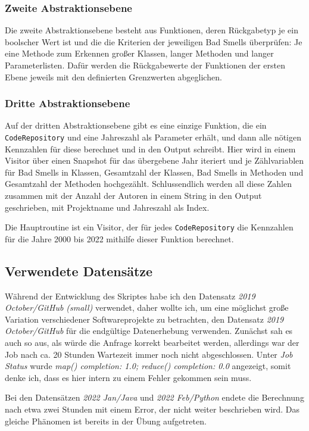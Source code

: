 \documentclass[12pt]{article}
\begin{document}
\subsubsection{Zweite Abstraktionsebene}
Die zweite Abstraktionsebene besteht aus Funktionen, deren Rückgabetyp je ein boolscher Wert ist und die die Kriterien der jeweiligen Bad Smells überprüfen: Je eine Methode zum Erkennen großer Klassen, langer Methoden und langer Parameterlisten.
Dafür werden die Rückgabewerte der Funktionen der ersten Ebene jeweils mit den definierten Grenzwerten abgeglichen.

\subsubsection{Dritte Abstraktionsebene}
Auf der dritten Abstraktionsebene gibt es eine einzige Funktion, die ein \texttt{CodeRepository} und eine Jahreszahl als Parameter erhält, und dann alle nötigen Kennzahlen für diese berechnet und in den Output schreibt.
Hier wird in einem Visitor über einen Snapshot für das übergebene Jahr iteriert und je Zählvariablen für Bad Smells in Klassen, Gesamtzahl der Klassen, Bad Smells in Methoden und Gesamtzahl der Methoden hochgezählt.
Schlussendlich werden all diese Zahlen zusammen mit der Anzahl der Autoren in einem String in den Output geschrieben, mit Projektname und Jahreszahl als Index.

Die Hauptroutine ist ein Visitor, der für jedes \texttt{CodeRepository} die Kennzahlen für die Jahre 2000 bis 2022 mithilfe dieser Funktion berechnet.

\subsection{Verwendete Datensätze}
Während der Entwicklung des Skriptes habe ich den Datensatz \emph{2019 October/GitHub (small)} verwendet, daher wollte ich, um eine möglichst große Variation verschiedener Softwareprojekte zu betrachten, den Datensatz \emph{2019 October/GitHub} für die endgültige Datenerhebung verwenden.
Zunächst sah es auch so aus, als würde die Anfrage korrekt bearbeitet werden, allerdings war der Job nach ca. 20 Stunden Wartezeit immer noch nicht abgeschlossen.
Unter \emph{Job Status} wurde \emph{map() completion: 1.0; reduce() completion: 0.0} angezeigt, somit denke ich, dass es hier intern zu einem Fehler gekommen sein muss.

Bei den Datensätzen \emph{2022 Jan/Java} und \emph{2022 Feb/Python} endete die Berechnung nach etwa zwei Stunden mit einem Error, der nicht weiter beschrieben wird.
Das gleiche Phänomen ist bereits in der Übung aufgetreten.
\end{document}
